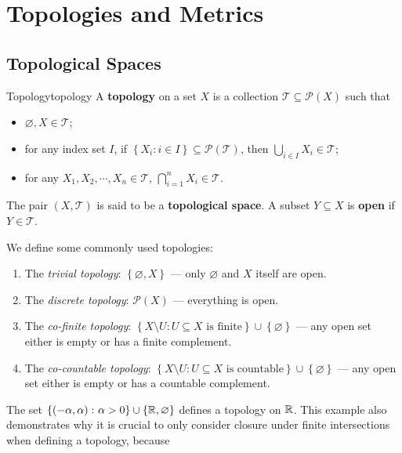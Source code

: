 \documentclass[math]{amznotes}
\theoremstyle{remark}
\begin{document}
\tableofcontents
\chapter{Topologies and Metrics}
\section{Topological Spaces}
\begin{dfnbox}{Topology}{topology}
    A {\color{red} \textbf{topology}} on a set $X$ is a collection $\mathcal{T} \subseteq \mathcal{P}\left(X\right)$ such that 
    \begin{itemize}
        \item $\varnothing, X \in \mathcal{T}$;
        \item for any index set $I$, if $\left\{X_i \colon i \in I\right\} \subseteq \mathcal{P}\left(\mathcal{T}\right)$, then $\bigcup_{i \in I}X_i \in \mathcal{T}$;
        \item for any $X_1, X_2, \cdots, X_n \in \mathcal{T}$, $\bigcap_{i = 1}^nX_i \in \mathcal{T}$.
    \end{itemize}
    The pair $\left(X, \mathcal{T}\right)$ is said to be a {\color{red} \textbf{topological space}}. A subset $Y \subseteq X$ is {\color{red} \textbf{open}} if $Y \in \mathcal{T}$.
\end{dfnbox}
We define some commonly used topologies:
\begin{enumerate}
    \item The \textit{trivial topology}: $\left\{\varnothing, X\right\}$ --- only $\varnothing$ and $X$ itself are open.
    \item The \textit{discrete topology}: $\mathcal{P}\left(X\right)$ --- everything is open.
    \item The \textit{co-finite topology}: $\left\{X \setminus U \colon U \subseteq X \textrm{ is finite}\right\} \cup \left\{\varnothing\right\}$ --- any open set either is empty or has a finite complement.
    \item The \textit{co-countable topology}: $\left\{X \setminus U \colon U \subseteq X \textrm{ is countable}\right\} \cup \left\{\varnothing\right\}$ --- any open set either is empty or has a countable complement.
\end{enumerate}
The set $\left\{\left(-\alpha, \alpha\right) \colon \alpha > 0\right\} \cup \left\{\mathbb{R}, \varnothing\right\}$ defines a topology on $\mathbb{R}$. This example also demonstrates why it is crucial to only consider closure under finite intersections when defining a topology, because
\end{document}
